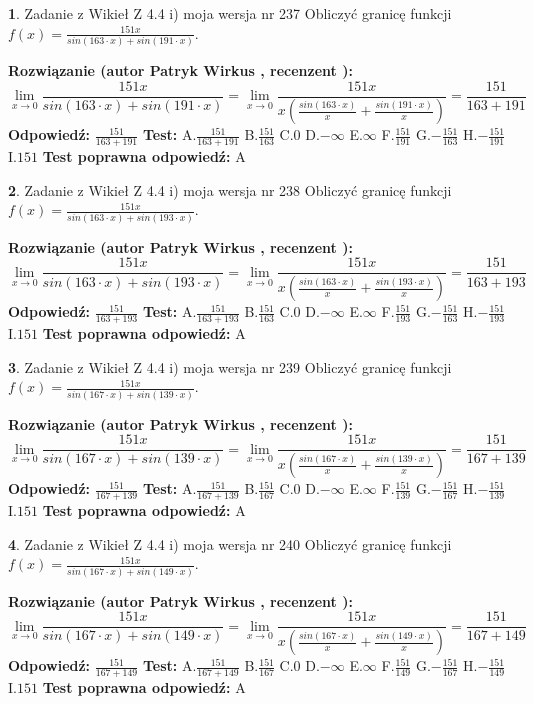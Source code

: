 \documentclass[12pt, a4paper]{article}
\theoremstyle{definition} %
\newtheorem{zad}{}
\newcommand{\zadStart}[1]{\begin{zad}#1\newline}
\newcommand{\zadStop}{\end{zad}}
\newcommand{\rozwStart}[2]{\noindent \textbf{Rozwiązanie (autor #1 , recenzent #2): }\newline}
\newcommand{\rozwStop}{\newline}
\newcommand{\odpStart}{\noindent \textbf{Odpowiedź:}\newline}
\newcommand{\odpStop}{\newline}
\newcommand{\testStart}{\noindent \textbf{Test:}\newline}
\newcommand{\testStop}{\newline}
\newcommand{\kluczStart}{\noindent \textbf{Test poprawna odpowiedź:}\newline}
\newcommand{\kluczStop}{\newline}
\begin{document}
\zadStart{Zadanie z Wikieł Z 4.4 i) moja wersja nr 237}
Obliczyć granicę funkcji $f(x)=\frac{151x}{sin(163\cdot x) +sin(191\cdot x)}$.
\zadStop
\rozwStart{Patryk Wirkus}{}
$$\lim\limits_{x\to 0}\frac{151x}{sin(163\cdot x) +sin(191\cdot x)}=\lim\limits_{x\to 0}\frac{151x}{x(\frac{sin(163\cdot x)}{x}+\frac{sin(191\cdot x)}{x})}=\frac{151}{163+191}$$
\rozwStop
\odpStart
$\frac{151}{163+191}$
\odpStop
\testStart
A.$\frac{151}{163+191}$
B.$\frac{151}{163}$
C.$0$
D.$-\infty$
E.$\infty$
F.$\frac{151}{191}$
G.$-\frac{151}{163}$
H.$-\frac{151}{191}$
I.$151$
\testStop
\kluczStart
A
\kluczStop



\zadStart{Zadanie z Wikieł Z 4.4 i) moja wersja nr 238}
Obliczyć granicę funkcji $f(x)=\frac{151x}{sin(163\cdot x) +sin(193\cdot x)}$.
\zadStop
\rozwStart{Patryk Wirkus}{}
$$\lim\limits_{x\to 0}\frac{151x}{sin(163\cdot x) +sin(193\cdot x)}=\lim\limits_{x\to 0}\frac{151x}{x(\frac{sin(163\cdot x)}{x}+\frac{sin(193\cdot x)}{x})}=\frac{151}{163+193}$$
\rozwStop
\odpStart
$\frac{151}{163+193}$
\odpStop
\testStart
A.$\frac{151}{163+193}$
B.$\frac{151}{163}$
C.$0$
D.$-\infty$
E.$\infty$
F.$\frac{151}{193}$
G.$-\frac{151}{163}$
H.$-\frac{151}{193}$
I.$151$
\testStop
\kluczStart
A
\kluczStop



\zadStart{Zadanie z Wikieł Z 4.4 i) moja wersja nr 239}
Obliczyć granicę funkcji $f(x)=\frac{151x}{sin(167\cdot x) +sin(139\cdot x)}$.
\zadStop
\rozwStart{Patryk Wirkus}{}
$$\lim\limits_{x\to 0}\frac{151x}{sin(167\cdot x) +sin(139\cdot x)}=\lim\limits_{x\to 0}\frac{151x}{x(\frac{sin(167\cdot x)}{x}+\frac{sin(139\cdot x)}{x})}=\frac{151}{167+139}$$
\rozwStop
\odpStart
$\frac{151}{167+139}$
\odpStop
\testStart
A.$\frac{151}{167+139}$
B.$\frac{151}{167}$
C.$0$
D.$-\infty$
E.$\infty$
F.$\frac{151}{139}$
G.$-\frac{151}{167}$
H.$-\frac{151}{139}$
I.$151$
\testStop
\kluczStart
A
\kluczStop



\zadStart{Zadanie z Wikieł Z 4.4 i) moja wersja nr 240}
Obliczyć granicę funkcji $f(x)=\frac{151x}{sin(167\cdot x) +sin(149\cdot x)}$.
\zadStop
\rozwStart{Patryk Wirkus}{}
$$\lim\limits_{x\to 0}\frac{151x}{sin(167\cdot x) +sin(149\cdot x)}=\lim\limits_{x\to 0}\frac{151x}{x(\frac{sin(167\cdot x)}{x}+\frac{sin(149\cdot x)}{x})}=\frac{151}{167+149}$$
\rozwStop
\odpStart
$\frac{151}{167+149}$
\odpStop
\testStart
A.$\frac{151}{167+149}$
B.$\frac{151}{167}$
C.$0$
D.$-\infty$
E.$\infty$
F.$\frac{151}{149}$
G.$-\frac{151}{167}$
H.$-\frac{151}{149}$
I.$151$
\testStop
\kluczStart
A
\kluczStop
\end{document}

